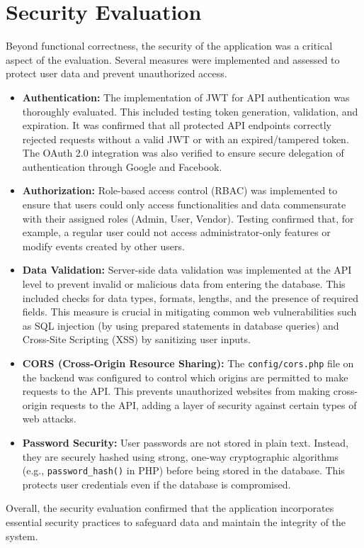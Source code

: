 \documentclass{report}
\begin{document}
\section{Security Evaluation}
\label{sec:security_evaluation}
Beyond functional correctness, the security of the application was a critical aspect of the evaluation. Several measures were implemented and assessed to protect user data and prevent unauthorized access.
\begin{itemize}
    \item \textbf{Authentication:} The implementation of JWT for API authentication was thoroughly evaluated. This included testing token generation, validation, and expiration. It was confirmed that all protected API endpoints correctly rejected requests without a valid JWT or with an expired/tampered token. The OAuth 2.0 integration was also verified to ensure secure delegation of authentication through Google and Facebook.
    \item \textbf{Authorization:} Role-based access control (RBAC) was implemented to ensure that users could only access functionalities and data commensurate with their assigned roles (Admin, User, Vendor). Testing confirmed that, for example, a regular user could not access administrator-only features or modify events created by other users.
    \item \textbf{Data Validation:} Server-side data validation was implemented at the API level to prevent invalid or malicious data from entering the database. This included checks for data types, formats, lengths, and the presence of required fields. This measure is crucial in mitigating common web vulnerabilities such as SQL injection (by using prepared statements in database queries) and Cross-Site Scripting (XSS) by sanitizing user inputs.
    \item \textbf{CORS (Cross-Origin Resource Sharing):} The \texttt{config/cors.php} file on the backend was configured to control which origins are permitted to make requests to the API. This prevents unauthorized websites from making cross-origin requests to the API, adding a layer of security against certain types of web attacks.
    \item \textbf{Password Security:} User passwords are not stored in plain text. Instead, they are securely hashed using strong, one-way cryptographic algorithms (e.g., \texttt{password\_hash()} in PHP) before being stored in the database. This protects user credentials even if the database is compromised.
\end{itemize}
Overall, the security evaluation confirmed that the application incorporates essential security practices to safeguard data and maintain the integrity of the system.
\end{document}
